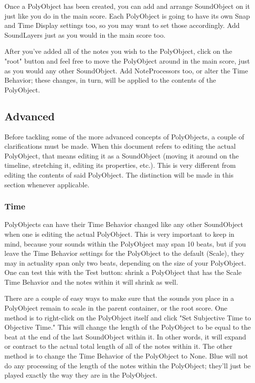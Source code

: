 Once a PolyObject has been created, you can add and arrange SoundObject
on it just like you do in the main score. Each PolyObject is going to
have its own Snap and Time Display settings too, so you may want to set
those accordingly. Add SoundLayers just as you would in the main score
too.

After you've added all of the notes you wish to the PolyObject, click on
the "root" button and feel free to move the PolyObject around in the
main score, just as you would any other SoundObject. Add NoteProcessors
too, or alter the Time Behavior; these changes, in turn, will be applied
to the contents of the PolyObject.

\subsection{Advanced}

Before tackling some of the more advanced concepts of PolyObjects, a
couple of clarifications must be made. When this document refers to
editing the actual PolyObject, that means editing it as a SoundObject
(moving it around on the timeline, stretching it, editing its
properties, etc.). This is very different from editing the contents of
said PolyObject. The distinction will be made in this section whenever
applicable.

\subsubsection{Time}

PolyObjects can have their Time Behavior changed like any other
SoundObject when one is editing the actual PolyObject. This is very
important to keep in mind, because your sounds within the PolyObject may
span 10 beats, but if you leave the Time Behavior settings for the
PolyObject to the default (Scale), they may in actuality span only two
beats, depending on the size of your PolyObject. One can test this with
the Test button: shrink a PolyObject that has the Scale Time Behavior
and the notes within it will shrink as well.

There are a couple of easy ways to make sure that the sounds you place
in a PolyObject remain to scale in the parent container, or the root
score. One method is to right-click on the PolyObject itself and click
"Set Subjective Time to Objective Time." This will change the length of
the PolyObject to be equal to the beat at the end of the last
SoundObject within it. In other words, it will expand or contract to the
actual total length of all of the notes within it. The other method is
to change the Time Behavior of the PolyObject to None. Blue will not do
any processing of the length of the notes within the PolyObject; they'll
just be played exactly the way they are in the PolyObject.

